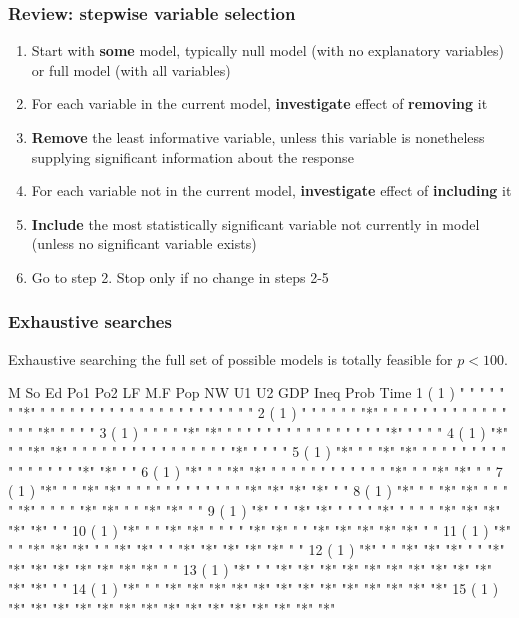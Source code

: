 \documentclass[a4paper]{article}
\begin{document}
\subsubsection{Review: stepwise variable selection}
\begin{enumerate}
	\item Start with \textcolor{myred}{\textbf{some}} model, typically null model (with no explanatory variables) or full model (with all variables)
	\item For each variable in the current model, \textcolor{myred}{\textbf{investigate}} effect of \textcolor{myred}{\textbf{removing}} it
	\item \textcolor{myred}{\textbf{Remove}} the least informative variable, unless this variable is nonetheless supplying significant information about the response
	\item For each variable not in the current model, \textcolor{myred}{\textbf{investigate}} effect of \textcolor{myred}{\textbf{including}} it
	\item \textcolor{myred}{\textbf{Include}} the most statistically significant variable not currently in model (unless no significant variable exists)
	\item Go to step 2. Stop only if no change in steps 2-5
\end{enumerate}
\subsubsection{Exhaustive searches}
Exhaustive searching the full set of possible models is totally feasible for \( p < 100 \).
\begin{Schunk}
\begin{Soutput}
          M   So  Ed  Po1 Po2 LF  M.F Pop NW  U1  U2  GDP Ineq Prob Time
1  ( 1 )  " " " " " " "*" " " " " " " " " " " " " " " " " " "  " "  " " 
2  ( 1 )  " " " " " " "*" " " " " " " " " " " " " " " " " "*"  " "  " " 
3  ( 1 )  " " " " "*" "*" " " " " " " " " " " " " " " " " "*"  " "  " " 
4  ( 1 )  "*" " " "*" "*" " " " " " " " " " " " " " " " " "*"  " "  " " 
5  ( 1 )  "*" " " "*" "*" " " " " " " " " " " " " " " " " "*"  "*"  " " 
6  ( 1 )  "*" " " "*" "*" " " " " " " " " " " " " "*" " " "*"  "*"  " " 
7  ( 1 )  "*" " " "*" "*" " " " " " " " " " " " " "*" "*" "*"  "*"  " " 
8  ( 1 )  "*" " " "*" "*" " " " " "*" " " " " "*" "*" " " "*"  "*"  " " 
9  ( 1 )  "*" " " "*" "*" " " " " "*" " " " " "*" "*" "*" "*"  "*"  " " 
10  ( 1 ) "*" " " "*" "*" " " " " "*" "*" " " "*" "*" "*" "*"  "*"  " " 
11  ( 1 ) "*" " " "*" "*" "*" " " "*" "*" " " "*" "*" "*" "*"  "*"  " " 
12  ( 1 ) "*" " " "*" "*" "*" " " "*" "*" "*" "*" "*" "*" "*"  "*"  " " 
13  ( 1 ) "*" " " "*" "*" "*" "*" "*" "*" "*" "*" "*" "*" "*"  "*"  " " 
14  ( 1 ) "*" " " "*" "*" "*" "*" "*" "*" "*" "*" "*" "*" "*"  "*"  "*" 
15  ( 1 ) "*" "*" "*" "*" "*" "*" "*" "*" "*" "*" "*" "*" "*"  "*"  "*" 
\end{Soutput}
\end{Schunk}
\end{document}
